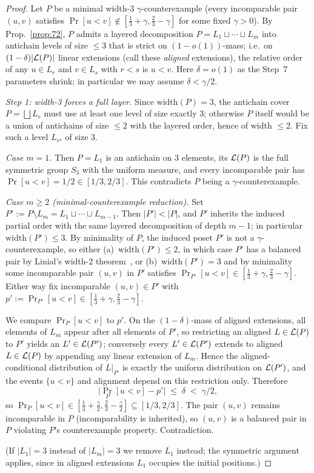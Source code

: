 \begin{proof}
Let $P$ be a minimal width-3 $\gamma$-counterexample
(every incomparable pair $(u,v)$ satisfies
$\Pr[u<v]\notin[\tfrac13+\gamma,\tfrac23-\gamma]$ for some fixed
$\gamma>0$).  By Prop.~\ref{prop:72}, $P$ admits a layered
decomposition $P=L_1\sqcup\cdots\sqcup L_m$ into antichain levels of
size $\le 3$ that is strict on $(1-o(1))$-mass; i.e.\ on
$(1-\delta)|\mathcal{L}(P)|$ linear extensions (call these \emph{aligned}
extensions), the relative order of any $u\in L_r$ and $v\in L_s$ with
$r<s$ is $u<v$.  Here $\delta=o(1)$ as the Step~7 parameters shrink;
in particular we may assume $\delta<\gamma/2$.

\smallskip
\noindent
\emph{Step 1: width-3 forces a full layer.}
Since $\mathrm{width}(P)=3$, the antichain cover
$P=\bigsqcup L_r$ must use at least one level of size exactly $3$;
otherwise $P$ itself would be a union of antichains of size $\le 2$
with the layered order, hence of width $\le 2$.  Fix such a level
$L_{r^\star}$ of size $3$.

\smallskip
\noindent
\emph{Case $m=1$.}
Then $P=L_1$ is an antichain on $3$ elements, its $\mathcal{L}(P)$ is
the full symmetric group $S_3$ with the uniform measure, and every
incomparable pair has $\Pr[u<v]=1/2\in[1/3,2/3]$.  This contradicts
$P$ being a $\gamma$-counterexample.

\smallskip
\noindent
\emph{Case $m\ge 2$ (minimal-counterexample reduction).}
Set $P':=P\setminus L_m=L_1\sqcup\cdots\sqcup L_{m-1}$.
Then $|P'|<|P|$, and $P'$ inherits the induced partial order with
the same layered decomposition of depth $m-1$; in particular
$\mathrm{width}(P')\le 3$.  By minimality of $P$, the induced
poset $P'$ is not a $\gamma$-counterexample, so either
(a)~$\mathrm{width}(P')\le 2$, in which case $P'$ has a balanced pair
by Linial's width-$2$ theorem~\cite{Linial1984}, or (b)~$\mathrm{width}(P')=3$ and by
minimality some incomparable pair $(u,v)$ in $P'$ satisfies
$\Pr_{P'}[u<v]\in[\tfrac13+\gamma,\tfrac23-\gamma]$.  Either way fix
incomparable $(u,v)\in P'$ with
$p':=\Pr_{P'}[u<v]\in[\tfrac13+\gamma,\tfrac23-\gamma]$.

We compare $\Pr_P[u<v]$ to $p'$.
On the $(1-\delta)$-mass of aligned extensions, all elements of $L_m$
appear after all elements of $P'$, so restricting an aligned
$L\in\mathcal{L}(P)$ to $P'$ yields an $L'\in\mathcal{L}(P')$; conversely every
$L'\in\mathcal{L}(P')$ extends to aligned $L\in\mathcal{L}(P)$ by appending any
linear extension of $L_m$.  Hence the aligned-conditional
distribution of $L|_{P'}$ is exactly the uniform distribution on
$\mathcal{L}(P')$, and the events $\{u<v\}$ and alignment depend on this
restriction only.  Therefore
\[
  \bigl|\Pr_P[u<v]-p'\bigr|
  \;\le\; \delta
  \;<\; \gamma/2,
\]
so $\Pr_P[u<v]\in[\tfrac13+\tfrac\gamma2,\tfrac23-\tfrac\gamma2]
\subseteq[1/3,2/3]$.  The pair $(u,v)$ remains incomparable in $P$
(incomparability is inherited), so $(u,v)$ is a balanced pair in $P$
violating $P$'s counterexample property.  Contradiction.

\smallskip
\noindent
(If $|L_1|=3$ instead of $|L_m|=3$ we remove $L_1$ instead; the
symmetric argument applies, since in aligned extensions $L_1$
occupies the initial positions.)
\end{proof}

